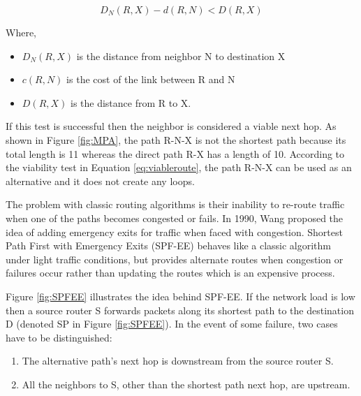 \begin{equation}
  D_N(R,X) - d(R,N) < D(R,X)
 \label{eq:viableroute}
\end{equation}

Where,
\begin{itemize}
 \item $D_N(R,X)$ is the distance from neighbor N to destination X
 \item $c(R,N)$ is the cost of the link between R and N
 \item $D(R,X)$ is the distance from R to X.
\end{itemize}


If this test is successful then the neighbor is considered a viable next hop. As shown in Figure \ref{fig:MPA}, the path R-N-X is not the shortest path because its total length is 11 whereas the direct path R-X has a length of 10. According to the viability test in Equation \ref{eq:viableroute}, the path R-N-X can be used as an alternative and it does not create any loops.

The problem with classic routing algorithms is their inability to re-route traffic when one of the paths becomes congested or fails. In 1990, Wang proposed the idea of adding emergency exits for traffic when faced with congestion. Shortest Path First with Emergency Exits (SPF-EE) \cite{SPFEE} behaves like a classic algorithm under light traffic conditions, but provides alternate routes when congestion or failures occur rather than updating the routes which is an expensive process. 

Figure \ref{fig:SPFEE} illustrates the idea behind SPF-EE. If the network load is low then a source router S forwards packets along its shortest path to the destination D (denoted SP in Figure \ref{fig:SPFEE}). In the event of some failure, two cases have to be distinguished:

\begin{enumerate}
 \item The alternative path's next hop is downstream from the source router S.
 \item All the neighbors to S, other than the shortest path next hop, are upstream.
\end{enumerate}

